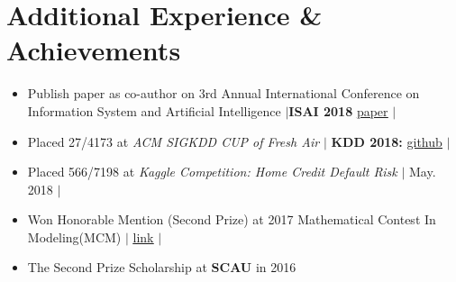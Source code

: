 \documentclass[letterpaper,10pt]{article}
\newcommand{\resumeSubHeadingListStart}{\begin{itemize}[leftmargin=*]}
\newcommand{\resumeSubHeadingListEnd}{\end{itemize}}
\newcommand{\shorterSection}[1]{\vspace{-10pt}\section{#1}}
\begin{document}
\shorterSection{Additional Experience \& Achievements}
  \resumeSubHeadingListStart
  \small
    \item{Publish paper as co-author on 3rd Annual International Conference on Information System and Artificial Intelligence } 
    $\vert$\textbf{ISAI 2018} 
     \href{http://iopscience.iop.org/article/10.1088/1742-6596/1069/1/012095}{\color{blue}\underline{paper}} $\vert$
    \vspace{-5pt}
     \item{Placed 27/4173 at  \textit{ACM SIGKDD CUP of Fresh Air} } $\vert$
  \textbf{KDD 2018:} \href{https://github.com/wuyujack/2018-ACM-SIGKDD-CUP-of-Fresh-Air-27th-Place-Solution}{\color{blue}\underline{github}} $\vert$
    \vspace{-5pt}   
     \item{Placed 566/7198 at  \textit{Kaggle Competition: Home Credit Default Risk} }
     $\vert$ May. 2018 $\vert$
    \vspace{-5pt}    
    
    \item{Won Honorable Mention (Second Prize) at 2017 Mathematical Contest In Modeling(MCM)
    $\vert$
    \href{https://www.comap.com/undergraduate/contests/mcm/contests/2017/results/2017_ICM_Problem_D_Results.pdf}{\color{blue}\underline{link}} $\vert$
}
    \vspace{-5pt}    
    
    
    \item{The Second Prize Scholarship at \textbf{SCAU} in 2016 }
    \vspace{-5pt}

  \resumeSubHeadingListEnd
\end{document}
